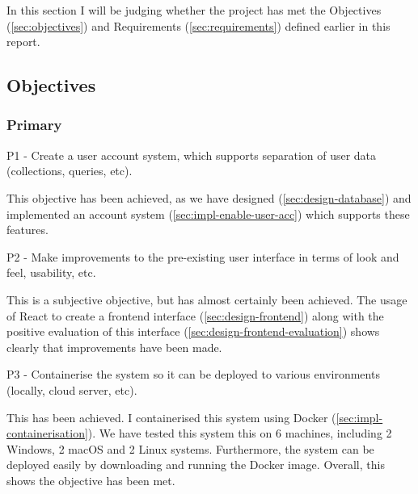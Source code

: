 \documentclass[12pt, letterpaper]{article}
\begin{document}
\begin{flushleft}
In this section I will be judging whether the project has met the Objectives (\ref{sec:objectives}) and Requirements (\ref{sec:requirements}) defined earlier in this report.
\end{flushleft}

\subsection{Objectives}
\subsubsection{Primary}\label{sec:evaluation-obj-primary}

\begin{displayquote}
P1 - Create a user account system, which supports separation of user data (collections, queries, etc).
\end{displayquote}

\begin{flushleft}
This objective has been achieved, as we have designed (\ref{sec:design-database}) and implemented an account system (\ref{sec:impl-enable-user-acc}) which supports these features.
\end{flushleft}

\begin{displayquote}
P2 - Make improvements to the pre-existing user interface in terms of look and feel, usability, etc.
\end{displayquote}

\begin{flushleft}
This is a subjective objective, but has almost certainly been achieved. The usage of React to create a frontend interface (\ref{sec:design-frontend}) along with the positive evaluation of this interface (\ref{sec:design-frontend-evaluation}) shows clearly that improvements have been made.
\end{flushleft}

\begin{displayquote}
P3 - Containerise the system so it can be deployed to various environments (locally, cloud server, etc).
\end{displayquote}

\begin{flushleft}
This has been achieved. I containerised this system using Docker (\ref{sec:impl-containerisation}). We have tested this system this on 6 machines, including 2 Windows, 2 macOS and 2 Linux systems. Furthermore, the system can be deployed easily by downloading and running the Docker image. Overall, this shows the objective has been met.
\end{flushleft}
\end{document}
